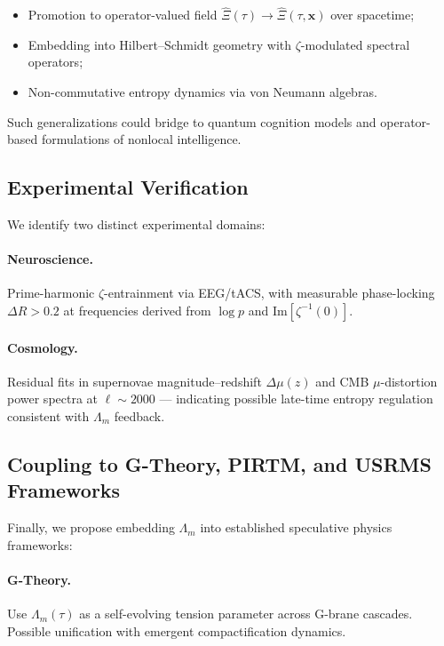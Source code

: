\documentclass{article}
\theoremstyle{plain}
\theoremstyle{claimstyle}
\begin{document}
\begin{itemize}
    \item Promotion to operator-valued field $\hat{\Xi}(\tau) \to \hat{\Xi}(\tau, \mathbf{x})$ over spacetime;
    \item Embedding into Hilbert–Schmidt geometry with $\zeta$-modulated spectral operators;
    \item Non-commutative entropy dynamics via von Neumann algebras.
\end{itemize}

Such generalizations could bridge to quantum cognition models and operator-based formulations of nonlocal intelligence.

\subsection{Experimental Verification}

We identify two distinct experimental domains:

\paragraph{Neuroscience.}
Prime-harmonic $\zeta$-entrainment via EEG/tACS, with measurable phase-locking $\Delta R > 0.2$ at frequencies derived from $\log p$ and $\text{Im}[\zeta^{-1}(0)]$.

\paragraph{Cosmology.}
Residual fits in supernovae magnitude–redshift $\Delta\mu(z)$ and CMB $\mu$-distortion power spectra at $\ell \sim 2000$ — indicating possible late-time entropy regulation consistent with $\Lambda_m$ feedback.

\subsection{Coupling to G-Theory, PIRTM, and USRMS Frameworks}

Finally, we propose embedding $\Lambda_m$ into established speculative physics frameworks:

\paragraph{G-Theory.} 
Use $\Lambda_m(\tau)$ as a self-evolving tension parameter across G-brane cascades. Possible unification with emergent compactification dynamics.
\end{document}
